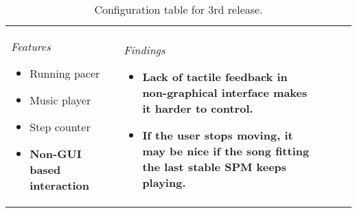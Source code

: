 \begin{table}
\begin{tabular}{|l|l|l|l|l|}
{		\textit{Features}
		\begin{itemize}[leftmargin=*]
		\item Running pacer
		\item Music player
		\item Step counter
		\item {\color{darkGreen}\textbf{Non-GUI based interaction}}
		\end{itemize}
	}
	& \parbox[t][][c]{0.20\textwidth}{ 
		\textit{Findings} 
		\begin{itemize}[leftmargin=*]
		\item {\color{darkGreen}\textbf{Lack of tactile feedback in non-graphical interface makes it harder to control.}}
		\item {\color{darkGreen}\textbf{If the user stops moving, it may be nice if the song fitting the last stable SPM keeps playing.}}
		\end{itemize}
	}\\ \hline     
\end{tabular}
\caption[Table caption text]{Configuration table for 3rd release.}
\label{table:config2}
\end{table}